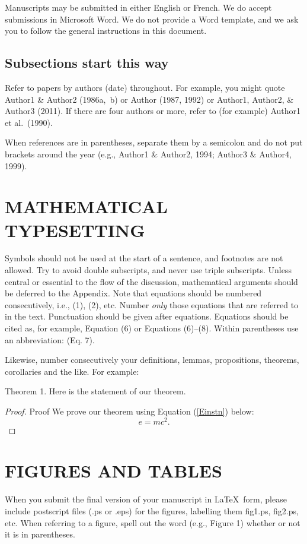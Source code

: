 \documentclass[12pt]{TD-CJS}
\begin{document}
Manuscripts may be submitted in either English or French.  We do accept submissions in Microsoft Word.  We do not provide a Word template, and we ask you to follow the general instructions in this document.

\subsection{Subsections start this way}
Refer to papers by authors (date) throughout. For example,
you might quote Author1 \& Author2 (1986a,~b) or Author (1987, 1992) or 
Author1, Author2, \& Author3 (2011). If there
are four authors or more, refer to (for example) Author1 et al.\ (1990).

When references are in parentheses, separate them by a semicolon and do not
put brackets around the year (e.g., Author1 \& Author2, 1994; Author3 \&
Author4, 1999).

\section{MATHEMATICAL TYPESETTING}
Symbols should not be used at the start of a sentence, and footnotes are not allowed. Try to avoid double subscripts, and never use triple subscripts. Unless central or essential to the flow of the discussion, mathematical arguments should be deferred to the Appendix.
Note that equations should be numbered consecutively, i.e., (1), (2), etc. Number
\textit{only} those equations that are referred to in the text.  Punctuation should be given after equations. Equations should be cited as, for example, Equation (6) or Equations (6)--(8). Within parentheses use an abbreviation: (Eq. 7).

Likewise, number consecutively your definitions, lemmas, propositions,
theorems, corollaries and the like. For example:

\begin{theorem}{Theorem 1.}{}%
Here is the statement of our theorem.
\end{theorem}
\begin{proof}{Proof}{}%
We prove our theorem using Equation (\ref{Einstn}) below:
\begin{equation}
e = mc^2.
\label{Einstn}
\end{equation}
\end{proof}

\section{FIGURES AND TABLES}
When you submit the final version of your manuscript in
\LaTeX \, form, please include postscript files (.ps or .eps) for the figures,
labelling them fig1.ps, fig2.ps, etc. When referring to a figure, spell out the word (e.g., Figure 1) whether or not it is in parentheses.
\end{document}
